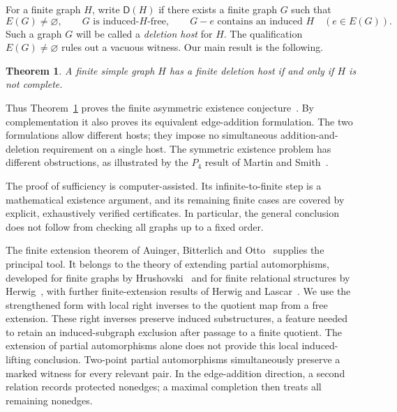 \documentclass[11pt,reqno]{amsart}
\newtheorem{theorem}{Theorem}[section]
\theoremstyle{definition}
\theoremstyle{remark}
\newcommand{\Dsat}{\mathsf{D}}
\begin{document}
For a finite graph $H$, write $\Dsat(H)$ if there exists a finite graph $G$ such that
\begin{equation}\label{eq:deletion-definition}
 E(G)\ne\varnothing,\qquad G\text{ is induced-}H\text{-free},\qquad
 G-e\text{ contains an induced }H\quad(e\in E(G)).
\end{equation}
Such a graph $G$ will be called a \emph{deletion host} for $H$. The qualification $E(G)\ne\varnothing$ rules out a vacuous witness. Our main result is the following.

\begin{theorem}\label{thm:main}
A finite simple graph $H$ has a finite deletion host if and only if $H$ is not complete.
\end{theorem}

Thus Theorem~\ref{thm:main} proves the finite asymmetric existence conjecture~\cite[Conjecture~1.7]{FHHS}. By complementation it also proves its equivalent edge-addition formulation. The two formulations allow different hosts; they impose no simultaneous addition-and-deletion requirement on a single host. The symmetric existence problem has different obstructions, as illustrated by the $P_4$ result of Martin and Smith~\cite{MS}.

The proof of sufficiency is computer-assisted. Its infinite-to-finite step is a mathematical existence argument, and its remaining finite cases are covered by explicit, exhaustively verified certificates. In particular, the general conclusion does not follow from checking all graphs up to a fixed order.

The finite extension theorem of Auinger, Bitterlich and Otto~\cite[Theorem~4.19]{ABO} supplies the principal tool. It belongs to the theory of extending partial automorphisms, developed for finite graphs by Hrushovski~\cite{Hrushovski} and for finite relational structures by Herwig~\cite{Herwig}, with further finite-extension results of Herwig and Lascar~\cite{HL}. We use the strengthened form with local right inverses to the quotient map from a free extension. These right inverses preserve induced substructures, a feature needed to retain an induced-subgraph exclusion after passage to a finite quotient. The extension of partial automorphisms alone does not provide this local induced-lifting conclusion. Two-point partial automorphisms simultaneously preserve a marked witness for every relevant pair. In the edge-addition direction, a second relation records protected nonedges; a maximal completion then treats all remaining nonedges.
\end{document}
